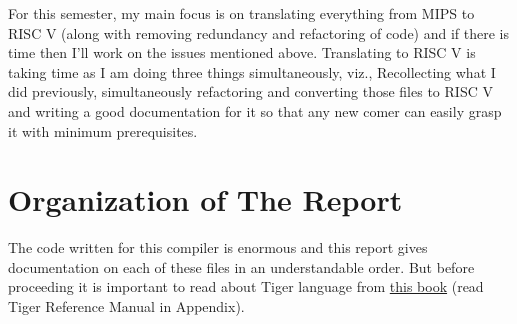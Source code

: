For this semester, my main focus is on translating everything from MIPS to RISC V (along with removing redundancy and refactoring of code) and if there is time then I'll work on the issues mentioned above. Translating to RISC V is taking time as I am doing three things simultaneously, viz., Recollecting what I did previously, simultaneously refactoring and converting those files to RISC V and writing a good documentation for it so that any new comer can easily grasp it with minimum prerequisites. 


\section{Organization of The Report}

The code written for this compiler is enormous and this report gives documentation on each of these files in an understandable order. But before proceeding it is important to read about Tiger language from \href{https://www.cs.princeton.edu/~appel/modern/ml/}{this book} (read Tiger Reference Manual in Appendix). 

